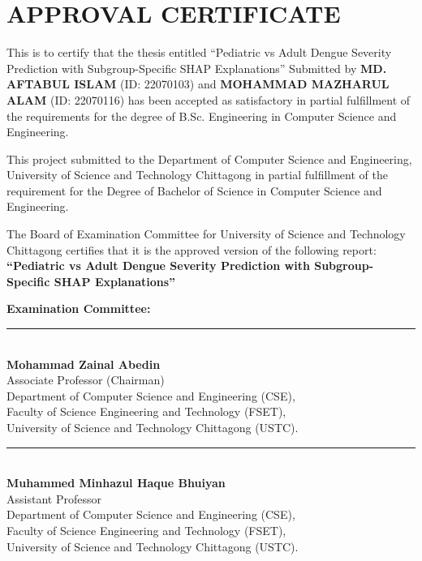\documentclass[12pt, a4paper]{report}
\begin{document}
\chapter*{APPROVAL CERTIFICATE}
This is to certify that the thesis entitled ``Pediatric vs Adult Dengue Severity Prediction with Subgroup-Specific SHAP Explanations'' Submitted by \textbf{MD. AFTABUL ISLAM} (ID: 22070103) and \textbf{MOHAMMAD MAZHARUL ALAM} (ID: 22070116) has been accepted as satisfactory in partial fulfillment of the requirements for the degree of B.Sc. Engineering in Computer Science and Engineering.

This project submitted to the Department of Computer Science and Engineering, University of Science and Technology Chittagong in partial fulfillment of the requirement for the Degree of Bachelor of Science in Computer Science and Engineering.

\vspace{1cm}
\noindent
The Board of Examination Committee for University of Science and Technology Chittagong certifies that it is the approved version of the following report: \\[0.3cm]
\textbf{``Pediatric vs Adult Dengue Severity Prediction with Subgroup-Specific SHAP Explanations''}

\vspace{1cm}
\noindent
\textbf{Examination Committee:}

\vspace{1.5cm}
\noindent
\rule{8cm}{0.4pt} \\
\textbf{Mohammad Zainal Abedin} \\
Associate Professor (Chairman) \\
Department of Computer Science and Engineering (CSE), \\
Faculty of Science Engineering and Technology (FSET), \\
University of Science and Technology Chittagong (USTC).

\vspace{1.5cm}
\noindent
\rule{8cm}{0.4pt} \\
\textbf{Muhammed Minhazul Haque Bhuiyan} \\
Assistant Professor \\
Department of Computer Science and Engineering (CSE), \\
Faculty of Science Engineering and Technology (FSET), \\
University of Science and Technology Chittagong (USTC).
\end{document}
